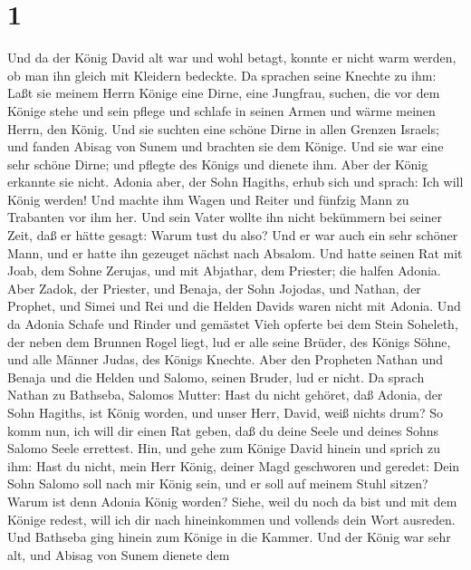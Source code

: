 \hypertarget{section}{%
\section{1}\label{section}}

 Und da der König David alt war und wohl betagt, konnte er
nicht warm werden, ob man ihn gleich mit Kleidern bedeckte. 
Da sprachen seine Knechte zu ihm: Laßt sie meinem Herrn Könige eine
Dirne, eine Jungfrau, suchen, die vor dem Könige stehe und sein pflege
und schlafe in seinen Armen und wärme meinen Herrn, den König.
 Und sie suchten eine schöne Dirne in allen Grenzen Israels;
und fanden Abisag von Sunem und brachten sie dem Könige. 
Und sie war eine sehr schöne Dirne; und pflegte des Königs und dienete
ihm. Aber der König erkannte sie nicht.  Adonia aber, der
Sohn Hagiths, erhub sich und sprach: Ich will König werden! Und machte
ihm Wagen und Reiter und fünfzig Mann zu Trabanten vor ihm her.
 Und sein Vater wollte ihn nicht bekümmern bei seiner Zeit,
daß er hätte gesagt: Warum tust du also? Und er war auch ein sehr
schöner Mann, und er hatte ihn gezeuget nächst nach Absalom.
 Und hatte seinen Rat mit Joab, dem Sohne Zerujas, und mit
Abjathar, dem Priester; die halfen Adonia.  Aber Zadok, der
Priester, und Benaja, der Sohn Jojodas, und Nathan, der Prophet, und
Simei und Rei und die Helden Davids waren nicht mit Adonia. 
Und da Adonia Schafe und Rinder und gemästet Vieh opferte bei dem Stein
Soheleth, der neben dem Brunnen Rogel liegt, lud er alle seine Brüder,
des Königs Söhne, und alle Männer Judas, des Königs Knechte.
 Aber den Propheten Nathan und Benaja und die Helden und
Salomo, seinen Bruder, lud er nicht.  Da sprach Nathan zu
Bathseba, Salomos Mutter: Hast du nicht gehöret, daß Adonia, der Sohn
Hagiths, ist König worden, und unser Herr, David, weiß nichts drum?
 So komm nun, ich will dir einen Rat geben, daß du deine
Seele und deines Sohns Salomo Seele errettest.  Hin, und
gehe zum Könige David hinein und sprich zu ihm: Hast du nicht, mein Herr
König, deiner Magd geschworen und geredet: Dein Sohn Salomo soll nach
mir König sein, und er soll auf meinem Stuhl sitzen? Warum ist denn
Adonia König worden?  Siehe, weil du noch da bist und mit
dem Könige redest, will ich dir nach hineinkommen und vollends dein Wort
ausreden.  Und Bathseba ging hinein zum Könige in die
Kammer. Und der König war sehr alt, und Abisag von Sunem dienete dem
